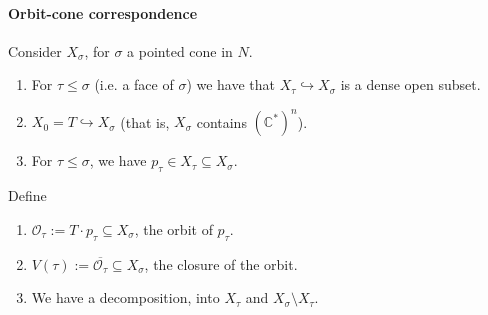 \documentclass[a4paper,12pt]{amsart}
\newcommand{\CC}{\mathbb{C}}
\begin{document}
\paragraph{Orbit-cone correspondence}
Consider $X_\sigma$, for $\sigma$ a pointed cone in $N$. 
\begin{enumerate}
\item For $\tau \leq \sigma$ (i.e. a face of $\sigma$) we have that $X_\tau \hookrightarrow X_\sigma$ is a dense open subset. 
\item $X_0 = T \hookrightarrow X_\sigma$ (that is, $X_\sigma$ contains $(\CC^*)^n$).
\item For $\tau \leq \sigma$, we have $p_\tau \in X_\tau \subseteq X_\sigma$.
\end{enumerate}
Define
\begin{enumerate}
\item $\mathcal{O}_\tau := T \cdot p_\tau \subseteq X_\sigma$, the orbit of $p_\tau$.  
\item $V(\tau) := \overline{\mathcal{O}_\tau} \subseteq X_\sigma$, the closure of the orbit.
\item We have a decomposition, into $X_\tau$ and $X_\sigma \setminus X_\tau$.
\end{enumerate}
\end{document}

